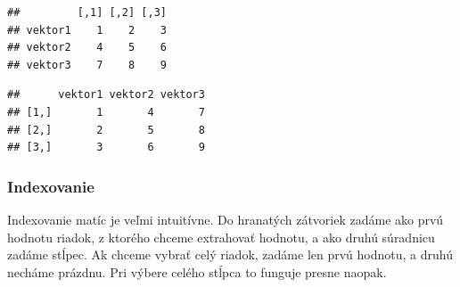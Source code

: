 \begin{Shaded}
\begin{Highlighting}[]
\StringTok{ }\NormalTok{(}\OperatorTok{:}\NormalTok{)}
\StringTok{ }\NormalTok{(}\NormalTok{, }\NormalTok{, }\NormalTok{)}
\StringTok{ }\NormalTok{(}\NormalTok{, }\NormalTok{, }\NormalTok{)}

\StringTok{ }

\end{Highlighting}
\end{Shaded}

\begin{verbatim}
##         [,1] [,2] [,3]
## vektor1    1    2    3
## vektor2    4    5    6
## vektor3    7    8    9
\end{verbatim}

\begin{Shaded}
\begin{Highlighting}[]
\StringTok{ }

\end{Highlighting}
\end{Shaded}

\begin{verbatim}
##      vektor1 vektor2 vektor3
## [1,]       1       4       7
## [2,]       2       5       8
## [3,]       3       6       9
\end{verbatim}

\hypertarget{indexovanie-1}{%
\subsubsection{Indexovanie}\label{indexovanie-1}}

Indexovanie matíc je veľmi intuitívne. Do hranatých zátvoriek zadáme ako
prvú hodnotu riadok, z ktorého chceme extrahovať hodnotu, a ako druhú
súradnicu zadáme stĺpec. Ak chceme vybrať celý riadok, zadáme len prvú
hodnotu, a druhú necháme prázdnu. Pri výbere celého stĺpca to funguje
presne naopak.

